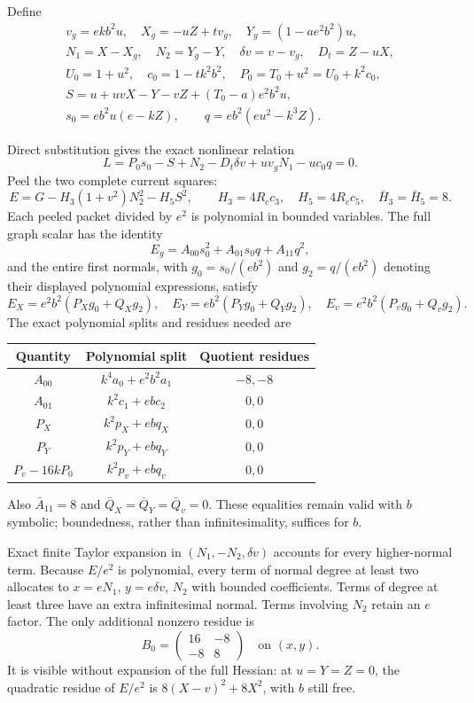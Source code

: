 Define
\begin{gather*}
v_g=ekb^2u,\quad X_g=-uZ+tv_g,\quad Y_g=(1-ae^2b^2)u,\\
N_1=X-X_g,\quad N_2=Y_g-Y,\quad \delta v=v-v_g,\quad D_t=Z-uX,\\
U_0=1+u^2,\quad c_0=1-tk^2b^2,\quad P_0=T_0+u^2=U_0+k^2c_0,\\
S=u+uvX-Y-vZ+(T_0-a)e^2b^2u,\\
s_0=eb^2u(e-kZ),\qquad q=eb^2(eu^2-k^3Z).
\end{gather*}

Direct substitution gives the exact nonlinear relation
\[
L=P_0s_0-S+N_2-D_t\delta v+uv_gN_1-uc_0q=0. \tag{E1}
\]
Peel the two complete current squares:
\[
E=G-H_3(1+v^2)N_2^2-H_5S^2,\qquad
H_3=4R_cc_3,\quad H_5=4R_cc_5,\quad \bar H_3=\bar H_5=8.
\]
Each peeled packet divided by $e^2$ is polynomial in bounded variables. The full graph scalar has the identity
\[
E_g=A_{00}s_0^2+A_{01}s_0q+A_{11}q^2,
\]
and the entire first normals, with $g_0=s_0/(eb^2)$ and $g_2=q/(eb^2)$ denoting their displayed polynomial expressions, satisfy
\[
E_X=e^2b^2(P_Xg_0+Q_Xg_2),\quad
E_Y=eb^2(P_Yg_0+Q_Yg_2),\quad
E_v=e^2b^2(P_vg_0+Q_vg_2).
\]
The exact polynomial splits and residues needed are
\begin{center}\small
\begin{tabular}{ccc}\toprule
Quantity&Polynomial split&Quotient residues\\\midrule
$A_{00}$&$k^4a_0+e^2b^2a_1$&$-8,-8$\\
$A_{01}$&$k^2c_1+ebc_2$&$0,0$\\
$P_X$&$k^2p_X+ebq_X$&$0,0$\\
$P_Y$&$k^2p_Y+ebq_Y$&$0,0$\\
$P_v-16kP_0$&$k^2p_v+ebq_v$&$0,0$\\\bottomrule
\end{tabular}
\end{center}
Also $\bar A_{11}=8$ and $\bar Q_X=\bar Q_Y=\bar Q_v=0$. These equalities remain valid with $b$ symbolic; boundedness, rather than infinitesimality, suffices for $b$.



Exact finite Taylor expansion in $(N_1,-N_2,\delta v)$ accounts for every higher-normal term. Because $E/e^2$ is polynomial, every term of normal degree at least two allocates to $x=eN_1$, $y=e\delta v$, $N_2$ with bounded coefficients. Terms of degree at least three have an extra infinitesimal normal. Terms involving $N_2$ retain an $e$ factor. The only additional nonzero residue is
\[
B_0=\begin{pmatrix}16&-8\\-8&8\end{pmatrix}
\quad\text{on }(x,y).
\]
It is visible without expansion of the full Hessian: at $u=Y=Z=0$, the quadratic residue of $E/e^2$ is $8(X-v)^2+8X^2$, with $b$ still free.

